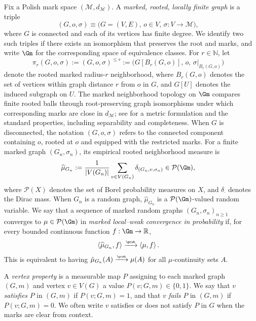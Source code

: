\documentclass[11pt]{article}
\theoremstyle{plain}
\begin{document}
Fix a Polish mark space $(\mathscr{M},d_{\mathscr{M}})$. A \emph{marked, rooted, locally finite graph} is a triple
\[
(G,o,\sigma)\equiv \bigl(G=(V,E),\,o\in V,\,\sigma:V\to\mathscr{M}\bigr),
\]
where $G$ is connected and each of its vertices has finite degree. We identify two such triples if there  exists an isomorphism that preserves the root and marks, and write $\Gm$ for the corresponding space of equivalence classes. For $r\in\mathbb{N}$, let
\[
\pi_r(G,o,\sigma):=(G,o,\sigma)^{\le r}
:=\bigl(G[B_r(G,o)],\,o,\,\sigma|_{B_r(G,o)}\bigr)
\]
denote the rooted marked radius-$r$ neighborhood, where $B_r(G,o)$ denotes the set of vertices within graph distance $r$ from $o$ in $G$, and $G[U]$ denotes the induced subgraph on $U$. 
The marked neighborhood topology on $\Gm$ compares finite rooted balls through root-preserving graph isomorphisms under which corresponding marks are close in $d_{\mathscr M}$; see \cite{Hofs24} for a metric formulation and the standard properties, including separability and completeness.
When $G$ is disconnected, the notation $(G,o,\sigma)$ refers to the connected component containing $o$, rooted at $o$ and equipped with the restricted marks. For a finite marked graph $(G_n,\sigma_n)$, its empirical rooted neighborhood measure is
%
\[
\widehat{\mu}_{G_n}:=\frac1{|V(G_n)|}\sum_{v\in V(G_n)}\delta_{(G_n,v,\sigma_n)}\in\mathcal{P}(\Gm),
\] 
where $\mathcal{P}(X)$ denotes the set of Borel probability measures on $X$, and $\delta_{\cdot}$ denotes the Dirac mass. 
When $G_n$ is a random graph, $\widehat{\mu}_{G_n}$ is a $\mathcal{P}(\Gm)$-valued random variable. We say that a sequence of marked random graphs $(G_n,\sigma_n)_{n\geq 1}$ converges to $\mu\in\mathcal{P}(\Gm)$ in
\emph{marked local--weak convergence in probability} if, for every bounded
continuous function $f:\Gm\to\mathbb{R}$,
\[
\left\langle \widehat{\mu}_{G_n},f\right\rangle
\xrightarrow{\scriptscriptstyle\prob}
\left\langle \mu,f\right\rangle.
\]
This is equivalent to having $\hat{\mu}_{G_n} (A) \xrightarrow{\scriptscriptstyle\prob} \mu (A)$ for all $\mu$-continuity sets $A$.

A \emph{vertex property} is a measurable map $P$ assigning to each marked graph $(G,m)$ and vertex $v\in V(G)$ a value $P(v;G,m)\in\{0,1\}$. We say that \(v\) \emph{satisfies \(P\)} in \((G,m)\) if \(P(v;G,m)=1\), and that \(v\) \emph{fails \(P\)} in \((G,m)\) if \(P(v;G,m)=0\). We often write \(v\) satisfies or does not satisfy $P$ in $G$ when the marks are clear from context.
\end{document}
